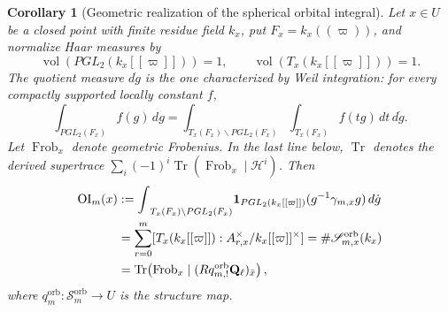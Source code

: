 \documentclass[11pt]{article}
\newtheorem{corollary}[theorem]{Corollary}
\theoremstyle{definition}
\theoremstyle{remark}
\newcommand{\Qell}{\mathbf Q_\ell}
\newcommand{\one}{\mathbf 1}
\newcommand{\Tr}{\operatorname{Tr}}
\begin{document}
\begin{corollary}[Geometric realization of the spherical orbital integral]
\label{cor:PGL2-orbital-integral-realization}
Let $x\in U$ be a closed point with finite residue field $k_x$, put
$F_x=k_x((\varpi))$, and normalize Haar measures by
\[
 \operatorname{vol}(PGL_2(k_x[[\varpi]]))=1,
 \qquad \operatorname{vol}(T_x(k_x[[\varpi]]))=1.
\]
The quotient measure $d\dot g$ is the one characterized by Weil integration:
for every compactly supported locally constant $f$,
\begin{equation}
 \int_{PGL_2(F_x)}f(g)\,dg
 =\int_{T_x(F_x)\backslash PGL_2(F_x)}
   \int_{T_x(F_x)}f(tg)\,dt\,d\dot g.
 \label{eq:PGL2-Weil-quotient-measure}
\end{equation}
Let $\operatorname{Frob}_x$ denote geometric Frobenius.  In the last line
below, $\Tr$ denotes the derived supertrace
$\sum_i(-1)^i\operatorname{Tr}(\operatorname{Frob}_x\mid\mathcal H^i)$.
Then
\begin{align}
 \operatorname{OI}_m(x)
 &:={\int}_{T_x(F_x)\backslash PGL_2(F_x)}
 \one_{PGL_2(k_x[[\varpi]])}(g^{-1}\gamma_{m,x}g)\,d\dot g
 \notag\\
 &=\sum_{r=0}^m
   [T_x(k_x[[\varpi]]):A_{r,x}^\times/k_x[[\varpi]]^\times]
 =\#\mathscr S_{m,x}^{\mathrm{orb}}(k_x)
 \notag\\
 &=\Tr\!\left(\operatorname{Frob}_x\mid
   (Rq^{\mathrm{orb}}_{m,!}\Qell)_{\bar x}\right),
 \label{eq:PGL2-orbital-trace}
\end{align}
where $q_m^{\mathrm{orb}}:\mathscr S_m^{\mathrm{orb}}\to U$ is the structure
map.
\end{corollary}
\end{document}
